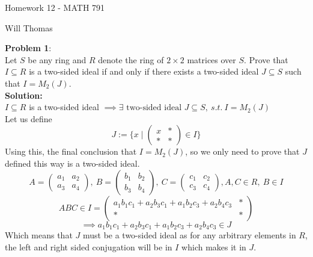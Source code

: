 \documentclass[11pt]{article}
\newcommand{\prob}[3]{\begin{flushleft}
        \textbf{Problem #1}: \\
        #2 
		\textbf{Solution:} 
		#3

\end{flushleft}}
\newcommand{\makeHWtitle}[1]{
    \begin{center}
    \Large{Homework #1 - MATH 791} 
        \vspace{5pt}
        
        \normalsize{Will Thomas}
        \vspace{5pt}
    \end{center}
}
\begin{document}
\makeHWtitle{12}

\prob{1}{
    Let $S$ be any ring and $R$ denote the ring of $2 \times 2$ matrices over $S$. Prove that $I \subseteq R$ is a two-sided ideal if and only if there exists a two-sided ideal $J \subseteq S$ such that $I = M_2(J)$. \\
}{ \\
    $I \subseteq R$ is a two-sided ideal $\implies \exists \text{ two-sided ideal } J \subseteq S,\ s.t.\ I = M_2(J)$ \\
    Let us define
    $$J := \{ x \mid \begin{pmatrix}
            x & * \\
            * & *
        \end{pmatrix} \in I \}$$
    Using this, the final conclusion that $I = M_2(J)$, so we only need to prove that $J$ defined this way is a two-sided ideal.
    $$A = \begin{pmatrix}
            a_1 & a_2 \\
            a_3 & a_4
        \end{pmatrix}, \ B = \begin{pmatrix}
            b_1 & b_2 \\
            b_3 & b_4
        \end{pmatrix}, \ C = \begin{pmatrix}
            c_1 & c_2 \\
            c_3 & c_4
        \end{pmatrix}, A, C \in R,\ B \in I$$
    $$ABC \in I = \begin{pmatrix}
            a_1b_1c_1 + a_2b_3c_1 + a_1b_2c_3 + a_2b_4c_3 & * \\
            *                                             & *
        \end{pmatrix}$$
    $$\implies a_1b_1c_1 + a_2b_3c_1 + a_1b_2c_3 + a_2b_4c_3 \in J$$
    Which means that $J$ must be a two-sided ideal as for any arbitrary elements in $R$, the left and right sided conjugation will be in $I$ which makes it in $J$. \\

}
\end{document}
